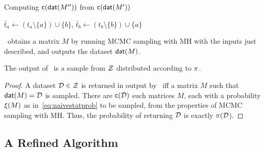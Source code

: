 \begin{algorithm}[ht]
  \caption{Computing $\mathsf{c}\lparen\mathsf{dat}\lparen M''\rparen\rparen$ from
  $\mathsf{c}\lparen\mathsf{dat}\lparen M'\rparen\rparen$}\label{algo:getcopiesnumneigh}
  \DontPrintSemicolon%




  $\bar{t}_a \gets (t_a \setminus \{a\}) \cup \{b\}$,  $\bar{t}_b \gets (t_b
  \setminus \{b\}) \cup \{a\}$\;

  \label{algline:samedat}


  \label{algline:updateend}
\end{algorithm}

\naivealgo\ obtains a matrix $M$ by running MCMC sampling with MH with the
inputs just described, and outputs the dataset $\mathsf{dat}\lparen M\rparen$.

\begin{theorem}\label{thm:correctnaive}
  The output of \naivealgo\ is a sample from $\mathcal{Z}$ distributed according to
  $\pi$.
\end{theorem}

\begin{proof}
 A dataset $\mathcal{D}  \in \mathcal{Z}$ is returned in output by \naivealgo\ iff a
 matrix $M$ such that $\mathsf{dat}\lparen M\rparen = \mathcal{D}$ is sampled. There are
 $\mathsf{c}\lparen\mathcal{D}\rparen$ such matrices $M$, each with a probability
 $\xi(M)$ as in~\eqref{eq:naivestatprob} to be sampled, from the
 properties of MCMC sampling with MH\@. Thus, the probability of returning
 $\mathcal{D}$ is exactly $\pi(\mathcal{D}$).
\end{proof}

\subsection{A Refined Algorithm}\label{sec:diffusr:refined}

